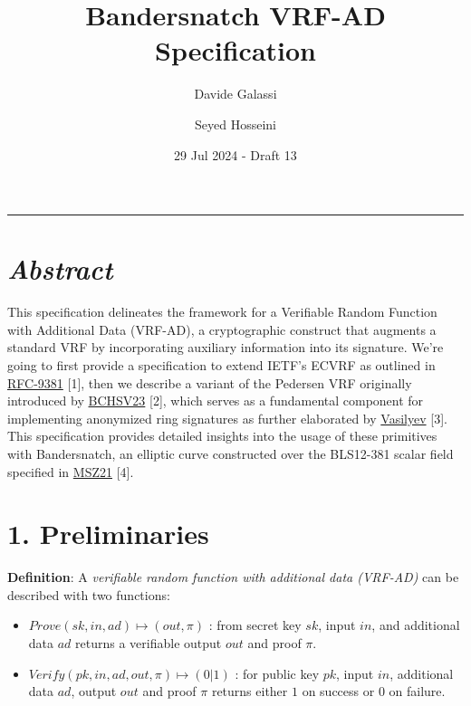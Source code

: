 \documentclass[
]{article}
\title{Bandersnatch VRF-AD Specification}
\author{Davide Galassi \and Seyed Hosseini}
\date{29 Jul 2024 - Draft 13}
\begin{document}
\maketitle

\newcommand{\G}{\langle G \rangle}
\newcommand{\F}{\mathbb{Z}^*_r}

\begin{center}\rule{0.5\linewidth}{0.5pt}\end{center}

\hypertarget{abstract}{%
\section{\texorpdfstring{\emph{Abstract}}{Abstract}}\label{abstract}}

This specification delineates the framework for a Verifiable Random
Function with Additional Data (VRF-AD), a cryptographic construct that
augments a standard VRF by incorporating auxiliary information into its
signature. We're going to first provide a specification to extend IETF's
ECVRF as outlined in
\href{https://datatracker.ietf.org/doc/rfc9381}{RFC-9381} {[}1{]}, then
we describe a variant of the Pedersen VRF originally introduced by
\href{https://eprint.iacr.org/2023/002}{BCHSV23} {[}2{]}, which serves
as a fundamental component for implementing anonymized ring signatures
as further elaborated by
\href{https://hackmd.io/ulW5nFFpTwClHsD0kusJAA}{Vasilyev} {[}3{]}. This
specification provides detailed insights into the usage of these
primitives with Bandersnatch, an elliptic curve constructed over the
BLS12-381 scalar field specified in
\href{https://eprint.iacr.org/2021/1152}{MSZ21} {[}4{]}.

\hypertarget{preliminaries}{%
\section{1. Preliminaries}\label{preliminaries}}

\textbf{Definition}: A \emph{verifiable random function with additional
data (VRF-AD)} can be described with two functions:

\begin{itemize}
\item
  \(Prove(sk,in,ad) \mapsto (out,\pi)\) : from secret key \(sk\), input
  \(in\), and additional data \(ad\) returns a verifiable output \(out\)
  and proof \(\pi\).
\item
  \(Verify(pk,in,ad,out,\pi) \mapsto (0|1)\) : for public key \(pk\),
  input \(in\), additional data \(ad\), output \(out\) and proof \(\pi\)
  returns either \(1\) on success or \(0\) on failure.
\end{itemize}
\end{document}
